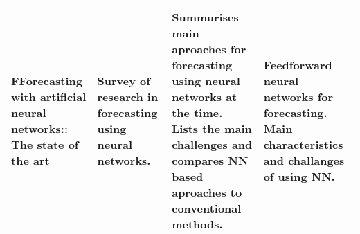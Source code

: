 \documentclass[10pt]{article}
\begin{document}
\begin{center}
\begin{longtable}{ | P | P | P | P |}
	FForecasting with artificial neural networks:: The state of the art  \cite{ZHANG1998}  
    &
    Survey of research in forecasting using neural networks.
    &
    Summurises main aproaches for forecasting using neural networks at the time. Lists the main challenges and compares NN based aproaches to conventional methods.
    &
    Feedforward neural networks for forecasting. \linebreak
    Main characteristics and challanges of using NN.
   	\\  \hline

  	\end{longtable}
\end{center}



 
\end{document}

